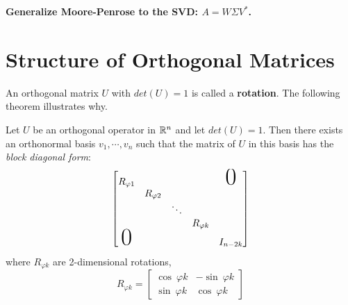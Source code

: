 \textbf{Generalize Moore-Penrose to the SVD: $A = W\Sigma V^{*}$. }

\section{Structure of Orthogonal Matrices}

An orthogonal matrix $U$ with $det(U) = 1$ is called a \textbf{rotation}. The following theorem illustrates why. 

\begin{theorem}
Let $U$ be an orthogonal operator in $\mathbb{R}^{n}$ and let $det(U) = 1$. Then there exists an orthonormal basis $v_{1}, \cdots, v_{n}$ such that the matrix of $U$ in this basis has the \textit{block diagonal form}:
$$\begin{bmatrix}
R_{\varphi 1} & & & & \makebox{\Huge 0} \\
 & R_{\varphi 2} & & & \\ 
 & & \ddots & & \\
 & & & R_{\varphi k} & \\
 \makebox{\Huge 0} & & & & I_{n - 2k}
\end{bmatrix}$$
where $R_{\varphi k}$ are 2-dimensional rotations, 
$$R_{\varphi k} = \begin{bmatrix}
\cos \ \varphi k & -\sin \  \varphi k \\
\sin \ \varphi k & \cos \ \varphi k
\end{bmatrix}$$
\end{theorem}

